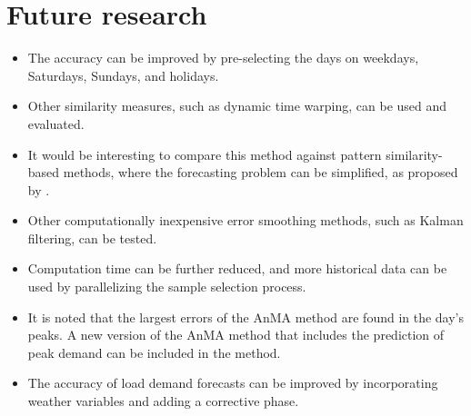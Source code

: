 \section{Future research}
\begin{itemize}
    \item The accuracy can be improved by pre-selecting the days on weekdays, Saturdays, Sundays, and holidays.
    \item Other similarity measures, such as dynamic time warping, can be used and evaluated.
    \item It would be interesting to compare this method against pattern similarity-based methods, where the forecasting problem can be simplified, as proposed by \citep{Dudek2016}.
    \item Other computationally inexpensive error smoothing methods, such as Kalman filtering, can be tested.
    \item Computation time can be further reduced, and more historical data can be used by parallelizing the sample selection process.
    \item It is noted that the largest errors of the AnMA method are found in the day's peaks. A new version of the AnMA method that includes the prediction of peak demand can be included in the method.
    \item The accuracy of load demand forecasts can be improved by incorporating weather variables and adding a corrective phase.
\end{itemize}

